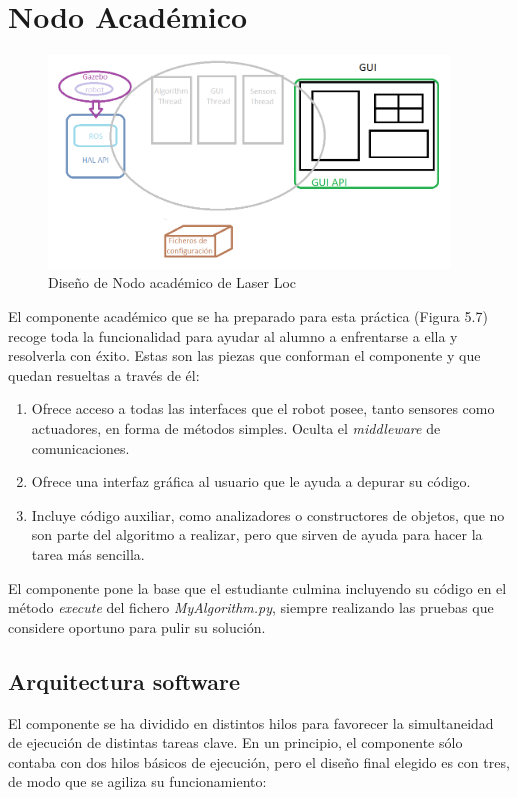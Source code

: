 \section{Nodo Académico}

\begin{figure}[H]
\begin{center}
	\includegraphics[width=0.95\textwidth]{figures/nodoacademicoll.png}
	\caption{Diseño de Nodo académico de Laser Loc}
	\label{fig.nodoacademicoll}
	\end{center}
\end{figure} 

El componente académico que se ha preparado para esta práctica (Figura 5.7) recoge toda la funcionalidad para ayudar al alumno a enfrentarse a ella y resolverla con éxito. Estas son las piezas que conforman el componente y que quedan resueltas a través de él:  

\begin{enumerate}[label=\alph*)]
	\item Ofrece acceso a todas las interfaces que el robot posee, tanto sensores como actuadores, en forma de métodos simples. Oculta el \textit{middleware} de comunicaciones.
	\item Ofrece una interfaz gráfica al usuario que le ayuda a depurar su código.
	\item Incluye código auxiliar, como analizadores o constructores de objetos, que no son parte del algoritmo a realizar, pero que sirven de ayuda para hacer la tarea más sencilla.
\end{enumerate}

El componente pone la base que el estudiante culmina incluyendo su código en el método \textit{execute} del fichero \textit{MyAlgorithm.py}, siempre realizando las pruebas que considere oportuno para pulir su solución.

\subsection{Arquitectura software}
El componente se ha dividido en distintos hilos para favorecer la simultaneidad de ejecución de distintas tareas clave. En un principio, el componente sólo contaba con dos hilos básicos de ejecución, pero el diseño final elegido es con tres, de modo que se agiliza su funcionamiento:

